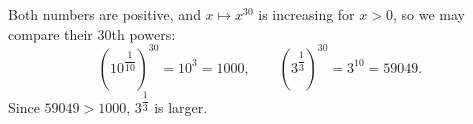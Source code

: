 Both numbers are positive, and $x\mapsto x^{30}$ is increasing for $x>0$, so we may compare their $30$th powers:
\[\left(10^{\dfrac{1}{10}}\right)^{30}=10^3=1000,\qquad\left(3^{\dfrac13}\right)^{30}=3^{10}=59049.\]
Since $59049>1000$, $\boxed{3^{\dfrac13}}$ is larger.

